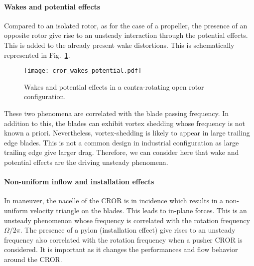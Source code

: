 \paragraph{Wakes and potential effects}

Compared to an isolated rotor, as for the case of a propeller,
the presence of an opposite rotor give rise to an unsteady
interaction through the potential effects.
This is added to the already present wake distortions. This is
schematically represented in Fig.~\ref{fig:cror_wakes_potential}.
\begin{figure}[htb]
  \centering
  \texttt{[image: cror\_wakes\_potential.pdf]}
  \caption{Wakes and potential effects in a 
  contra-rotating open rotor configuration.}
  \label{fig:cror_wakes_potential}
\end{figure}
These two phenomena are correlated with the blade passing frequency.
In addition to this, the blades can exhibit vortex shedding whose frequency
is not known a priori.
Nevertheless,
vortex-shedding is likely to appear in large trailing edge blades.
This is not a common design in industrial configuration as large trailing edge
give larger drag. Therefore, we can consider here that 
wake and potential effects are the driving unsteady phenomena.

\paragraph{Non-uniform inflow and installation effects}

In maneuver, the nacelle of the CROR is in incidence
which results in a non-uniform velocity triangle on the blades.
This leads to in-plane forces. This is an unsteady phenomenon
whose frequency is correlated with the rotation frequency $\Omega / 2 \pi$.
The presence of a pylon (installation effect) give rises to an unsteady frequency
also correlated with the rotation frequency when a pusher CROR is considered.
It is important as it changes the performances and flow behavior around the CROR.
